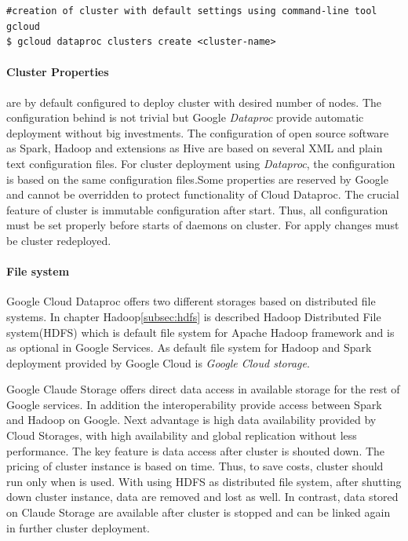 \documentclass[a4paper,12pt,oneside]{report}
\begin{document}
\begin{footnotesize}
\begin{lstlisting}[style=mybash]
#creation of cluster with default settings using command-line tool gcloud
$ gcloud dataproc clusters create <cluster-name>
\end{lstlisting}
\end{footnotesize}
 

\paragraph{Cluster Properties} are by default configured to deploy cluster with desired 
number of nodes. The configuration behind is not trivial but Google \textit{Dataproc} provide 
automatic deployment without big investments. The 
configuration of open source software as Spark, Hadoop  and extensions as Hive are based 
on several XML and plain text configuration files. For cluster deployment 
using \textit{Dataproc}, the configuration is based on the same configuration files.Some 
properties are reserved by Google and cannot be overridden 
to protect functionality of Cloud Dataproc. The crucial feature of cluster is immutable 
configuration after start. Thus, all configuration must be set 
properly before starts of daemons on cluster. For apply changes must be cluster redeployed. 

\paragraph{File system}
Google Cloud Dataproc offers two different storages based on distributed file systems. In 
chapter Hadoop\ref{subsec:hdfs} is described Hadoop Distributed File system(HDFS) which is 
default file system for Apache Hadoop framework and is as optional in Google Services. As 
default file system for Hadoop and Spark deployment provided by Google Cloud is \textit{Google Cloud storage}. 

Google Claude Storage offers direct data access in available storage for the rest of Google 
services. In addition the interoperability provide access between Spark and Hadoop on Google. 
Next advantage is high data availability provided by Cloud
 Storages, with high availability and global replication without less performance. The key 
 feature is data access after cluster is shouted down. The 
pricing of cluster instance is based on time. Thus, to save costs, cluster should run only when 
is used. With using HDFS as distributed file system, after 
shutting down cluster instance, data are removed and lost as well. In contrast, data stored on 
Claude Storage are available after cluster is stopped and 
can be linked again in further cluster deployment.
\end{document}

